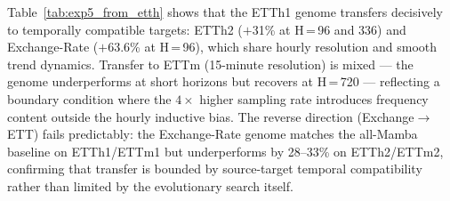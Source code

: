 Table~\ref{tab:exp5_from_etth} shows that the ETTh1 genome transfers decisively to temporally compatible targets: ETTh2 ($+$31\% at H\,=\,96 and 336) and Exchange-Rate ($+$63.6\% at H\,=\,96), which share hourly resolution and smooth trend dynamics.
Transfer to ETTm (15-minute resolution) is mixed — the genome underperforms at short horizons but recovers at H\,=\,720 — reflecting a boundary condition where the $4{\times}$ higher sampling rate introduces frequency content outside the hourly inductive bias.
The reverse direction (Exchange$\to$ETT) fails predictably: the Exchange-Rate genome matches the all-Mamba baseline on ETTh1/ETTm1 but underperforms by 28--33\% on ETTh2/ETTm2, confirming that transfer is bounded by source-target temporal compatibility rather than limited by the evolutionary search itself.

